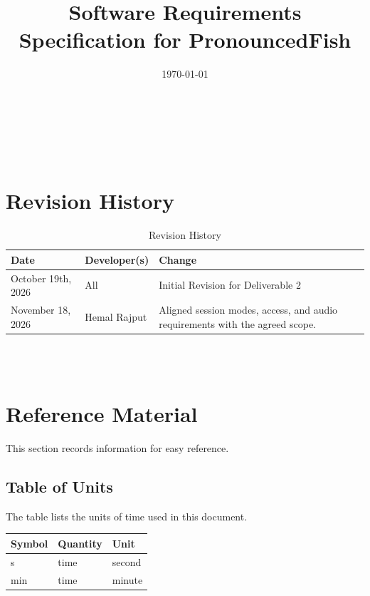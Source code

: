 \documentclass[12pt]{article}
\begin{document}
\title{Software Requirements Specification for PronouncedFish}
\author{\authname}
\date{\today}
	
\maketitle

~\newpage


\tableofcontents

~\newpage

\section*{Revision History}

\begin{table}[hp]
\caption{Revision History} \label{TblRevisionHistory}
\begin{tabularx}{\textwidth}{llX}
\toprule
\textbf{Date} & \textbf{Developer(s)} & \textbf{Change}\\
\midrule
October 19th, 2026 & All & Initial Revision for Deliverable 2\\
November 18, 2026 & Hemal Rajput & Aligned session modes, access, and audio requirements with the agreed scope.\\
\bottomrule
\end{tabularx}
\end{table}

~\\

~\newpage

\section{Reference Material} \label{sec:reference}

This section records information for easy reference.

\subsection{Table of Units}

The table lists the units of time used in this document.
~\newline

\renewcommand{\arraystretch}{1.2}
  \noindent \begin{tabular}{l l l} 
    \toprule		
    \textbf{Symbol} & \textbf{Quantity} & \textbf{Unit}\\
    \midrule 
    \si{\second} & time & second\\
    \si{\minute} & time & minute\\
    \bottomrule
  \end{tabular}
\end{document}
